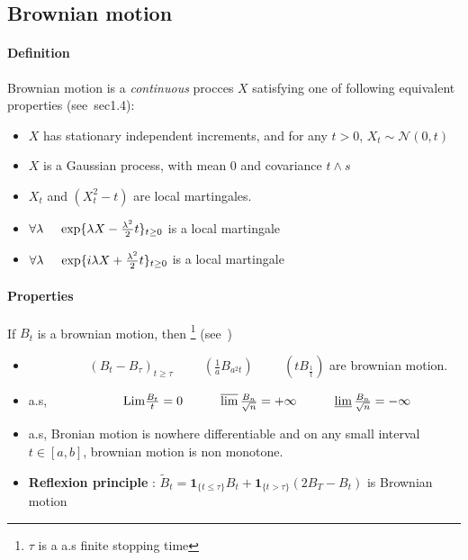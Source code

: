 \documentclass[a4paper,10pt]{article}
\begin{document}
\subsection{Brownian motion} 
\paragraph{Definition} Brownian motion is a \textit{continuous} procces $X$ satisfying one of following equivalent properties  (see~\cite{MONIQUE}sec1.4):
\begin{itemize}
 \item $X$ has stationary independent increments, and for any $t>0$, $X_t \sim \mathcal{N}(0,t)$
 \item $X$ is a Gaussian process, with mean 0 and covariance $t\wedge s$
 \item $X_t$ and $(X_t^2 - t)$ are local martingales.
 \item $\forall \lambda \hspace{0.5cm} \text{exp}\{  \lambda X - \frac{\lambda^2}{2}t \}_{t\geq0}$ is a local martingale
 \item $\forall \lambda \hspace{0.5cm} \text{exp}\{ i\lambda X + \frac{\lambda^2}{2}t \}_{t\geq0}$ is a local martingale
\end{itemize}
\paragraph{Properties}
If $B_t$ is a brownian motion, then \footnote{$\tau$ is a a.s finite stopping time} (see~\cite{PETER})
\begin{itemize}
 \item $\hspace{2cm} (B_t-B_{\tau})_{t\geq \tau} \hspace{1cm}  (\frac{1}{a}B_{a^2 t}) \hspace{1cm}  (tB_{\frac{1}{t}})$ are brownian motion.
 \item a.s, $\hspace{2cm} \text{Lim}\frac{B_t}{t} = 0   \hspace{1cm} \varlimsup\frac{B_n}{\sqrt{n}}=+\infty \hspace{1cm} \varliminf\frac{B_n}{\sqrt{n}}=-\infty$
 \item a.s, Bronian motion is nowhere differentiable and on any small interval $t\in[a,b]$, brownian motion is non monotone.
 \item \textbf{Reflexion principle} : $\tilde{B}_t = \mathbf{1}_{\{t\leq \tau\}} B_t + \mathbf{1}_{\{t>\tau\}} (2B_T - B_t) $ is Brownian motion  
\end{itemize}
\end{document}
